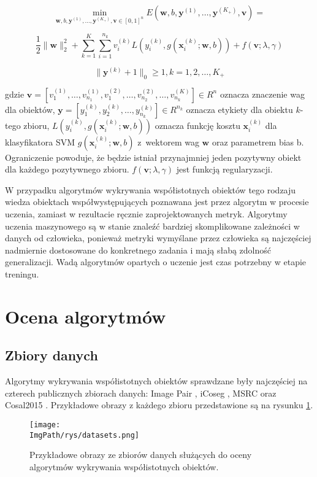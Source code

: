 \documentclass[a4paper,12pt,twoside,openany]{report}
\newcommand{\ImgPath}{.}
\begin{document}
	$$
		\min_{\mathbf{w},b,\mathbf{y}^{(1)}, \dots, \mathbf{y}^{(K_+)},\mathbf{v}\in[0,1]^n} E(\mathbf{w},b,\mathbf{y}^{(1)}, \dots, \mathbf{y}^{(K_+)},\mathbf{v}) = 
	$$

	$$
	\frac{1}{2} \|\mathbf{w}\|^2_2 + \sum_{k=1}^K \sum_{i=1}^{n_k}v_i^{(k)} L(y_i^{(k)}, g(\mathbf{x}^{(k)}_i;\mathbf{w},b)) + f(\mathbf{v};\lambda, \gamma)
	$$

	$$
	\|\mathbf{y}^{(k)}+1\|_0 \geq 1, k=1,2,\dots,K_+
	$$

	gdzie $\mathbf{v} = [v_1^{(1)}, \dots, v_{n_1}^{(1)}, v_{1}^{(2)}, \dots, v_{n_2}^{(2)}, \dots, v_{n_k}^{(K)}] \in R^{n}$ oznacza znaczenie wag dla obiektów, $\mathbf{y} = [y_1^{(k)}, y_{2}^{(k)}, \dots, y_{n_k}^{(k)}] \in R^{n_k}$ oznacza etykiety dla obiektu $k$-tego zbioru, $L(y_i^{(k)}, g(\mathbf{x}^{(k)}_i;\mathbf{w},b))$ oznacza funkcję kosztu $\mathbf{x}_i^{(k)}$ dla klasyfikatora SVM $g(\mathbf{x}^{(k)}_i;\mathbf{w},b)$ z~wektorem wag $\mathbf{w}$ oraz parametrem bias b. Ograniczenie powoduje, że będzie istniał przynajmniej jeden pozytywny obiekt dla każdego pozytywnego zbioru. $f(\mathbf{v};\lambda, \gamma)$ jest funkcją regularyzacji.

	W przypadku algorytmów wykrywania współistotnych obiektów tego rodzaju wiedza obiektach współwystępujących poznawana jest przez algorytm w procesie uczenia, zamiast w rezultacie ręcznie zaprojektowanych metryk. Algorytmy uczenia maszynowego są w stanie znaleźć bardziej skomplikowane zależności w danych od człowieka, ponieważ metryki wymyślane przez człowieka są najczęściej nadmiernie dostosowane do konkretnego zadania i mają słabą zdolność generalizacji. Wadą algorytmów opartych o uczenie jest czas potrzebny w etapie treningu.



	\section{Ocena algorytmów}
	\subsection{Zbiory danych}
	Algorytmy wykrywania współistotnych obiektów sprawdzane były najczęściej na czterech publicznych zbiorach danych: Image Pair \cite{ImagePair}, iCoseg \cite{iCoseg}, MSRC \cite{MSRC} oraz Cosal2015 \cite{cosal2015}. Przykładowe obrazy z każdego zbioru przedstawione są na rysunku \ref{ds}.

	\begin{figure}[h]
		\centering
		\texttt{[image: \\ImgPath/rys/datasets.png]}
		\caption{Przykładowe obrazy ze zbiorów danych służących do oceny algorytmów wykrywania współistotnych obiektów.}
		\label{ds}
	\end{figure}
\end{document}
